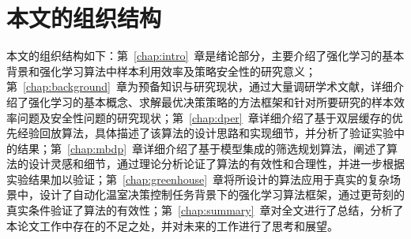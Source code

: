 \section{本文的组织结构}

本文的组织结构如下：第~\ref{chap:intro}~章是绪论部分，主要介绍了强化学习的基本背景和强化学习算法中样本利用效率及策略安全性的研究意义；第~\ref{chap:background}~章为预备知识与研究现状，通过大量调研学术文献，详细介绍了强化学习的基本概念、求解最优决策策略的方法框架和针对所要研究的样本效率问题及安全性问题的研究现状；第~\ref{chap:dper}~章详细介绍了基于双层缓存的优先经验回放算法，具体描述了该算法的设计思路和实现细节，并分析了验证实验中的结果；第~\ref{chap:mbdp}~章详细介绍了基于模型集成的筛选规划算法，阐述了算法的设计灵感和细节，通过理论分析论证了算法的有效性和合理性，并进一步根据实验结果加以验证；第~\ref{chap:greenhouse}~章将所设计的算法应用于真实的复杂场景中，设计了自动化温室决策控制任务背景下的强化学习算法框架，通过更苛刻的真实条件验证了算法的有效性；第~\ref{chap:summary}~章对全文进行了总结，分析了本论文工作中存在的不足之处，并对未来的工作进行了思考和展望。